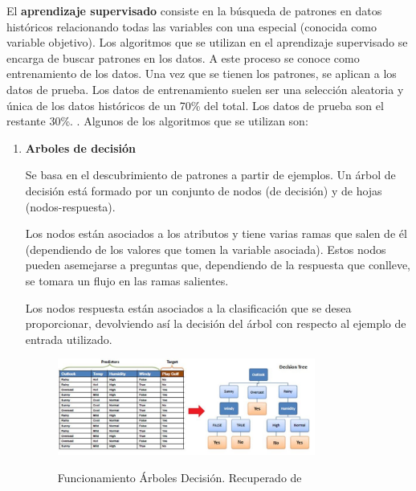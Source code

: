 El \textbf{aprendizaje supervisado} consiste en la búsqueda de patrones en datos históricos relacionando todas las variables con una especial (conocida como variable objetivo). Los algoritmos que se utilizan en el aprendizaje supervisado se encarga de buscar patrones en los datos. A este proceso se conoce como entrenamiento de los datos. Una vez que se tienen los patrones, se aplican a los datos de prueba. Los datos de entrenamiento suelen ser una selección aleatoria y única de los datos históricos de un 70\% del total. Los datos de prueba son el restante 30\%. \cite{Manguart2017}.
Algunos de los algoritmos que se utilizan son:
\begin{enumerate}
	\item \textbf{Arboles de decisión}
	
	Se basa en el descubrimiento de patrones a partir de ejemplos. Un árbol de decisión está formado por un conjunto de nodos (de decisión) y de hojas (nodos-respuesta).
	
	Los nodos están asociados a los atributos y tiene varias ramas que salen de él (dependiendo de los valores que tomen la variable asociada). Estos nodos pueden asemejarse a preguntas que, dependiendo de la respuesta que conlleve, se tomara un flujo en las ramas salientes.
	
	Los nodos respuesta están asociados a la clasificación que se desea proporcionar, devolviendo así la decisión del árbol con respecto al ejemplo de entrada utilizado.
	
	\begin{figure}[htb]
		\centering
		\caption{Funcionamiento Árboles Decisión. Recuperado de \protect{}}
		\includegraphics[width=0.8\textwidth]{recursos/arbol_decision_img1}
		\label{fig:fun_arb_dec}
	\end{figure}
	\FloatBarrier

	

\end{enumerate}
